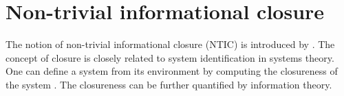 \documentclass[utf8]{article}
\begin{document}

	\section{Non-trivial informational closure} \label{sec:Non-trivial informational closure}

		The notion of non-trivial informational closure (NTIC) is introduced by \cite{BERTSCHINGER.2006}. The concept of closure is closely related to system identification in systems theory. One can define a system from its environment by computing the closureness of the system \citep{maturana1991autopoiesis, rosen1991life, pattee2012evolving, luhmann1995probleme}. The closureness can be further quantified by information theory.
\end{document}

